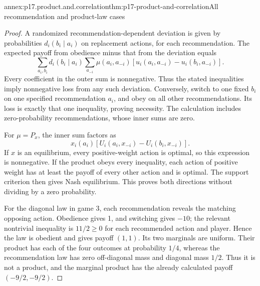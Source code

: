 \begin{annexitem}{annex:p17.product.and.correlation}{thm:p17-product-and-correlation}{All recommendation and product-law cases}
\begin{proof}
A randomized recommendation-dependent deviation
is given by probabilities \(d_i(b_i\mid a_i)\)
on replacement actions, for each recommendation.
The expected payoff from obedience minus
that from the deviation equals
\[
 \sum_{a_i,b_i}d_i(b_i\mid a_i)
 \sum_{a_{-i}}\mu(a_i,a_{-i})
       [u_i(a_i,a_{-i})-u_i(b_i,a_{-i})].
\]
Every coefficient in the outer sum
is nonnegative. Thus the stated
inequalities imply nonnegative
loss from any such deviation.
Conversely, switch to one fixed
\(b_i\) on one specified recommendation
\(a_i\), and obey on all other
recommendations. Its loss is exactly
that one inequality, proving necessity.
The calculation includes zero-probability
recommendations, whose inner sums are zero.

For \(\mu=P_x\), the inner sum factors as
\[
 x_i(a_i)
       [U_i(a_i,x_{-i})-U_i(b_i,x_{-i})].
\]
If \(x\) is an equilibrium, every
positive-weight action is optimal,
so this expression is nonnegative.
If the product obeys every inequality,
each action of positive weight
has at least the payoff of every
other action and is optimal.
The support criterion then gives
Nash equilibrium. This proves both
directions without dividing by a
zero probability.

For the diagonal law in game 3,
each recommendation reveals the
matching opposing action. Obedience
gives 1, and switching gives \(-10\);
the relevant nontrivial inequality
is \(11/2\geq0\) for each recommended
action and player. Hence the law
is obedient and gives payoff
\((1,1)\). Its two marginals are
uniform. Their product has each
of the four outcomes at probability
\(1/4\), whereas the recommendation
law has zero off-diagonal mass
and diagonal mass \(1/2\).
Thus it is not a product, and
the marginal product has the
already calculated payoff
\((-9/2,-9/2)\).
\end{proof}
\end{annexitem}

